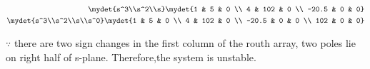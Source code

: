 \begin{enumerate}[label=\thesection.\arabic*.,ref=\thesection.\theenumi]
\begin{align}
\mydet{s^3\\s^2\\s}
\mydet{1 & 5 & 0 \\ 4 & 102 & 0 \\ -20.5 & 0 & 0}
\\
\mydet{s^3\\s^2\\s\\s^0}
\mydet{1 & 5 & 0 \\ 4 & 102 & 0 \\ -20.5 & 0 & 0 \\ 102 & 0 & 0}
\end{align}

$\because $ there are two sign changes in the first column of the routh array,  two  poles lie on right half of s-plane.  Therefore,the system is unstable.


\end{enumerate}
